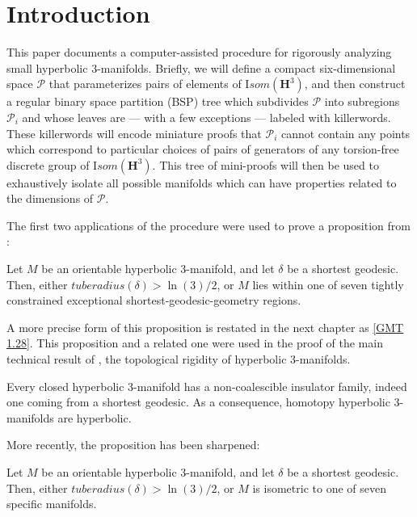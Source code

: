 \def\Arccosh{{\mathrm Arccosh}}
\chapter{Introduction}\label{Ch.intro}

This paper documents a computer-assisted procedure
for rigorously analyzing small hyperbolic $3$-manifolds.
Briefly, we will define a compact six-dimensional space ${\mathcal P}$
that parameterizes pairs of elements of ${\mathrm Isom}({\mathbf H}^3)$,
and then construct a regular binary space partition (BSP) tree
which subdivides ${\mathcal P}$ into subregions ${\mathcal P_i}$
and whose leaves are --- with a few exceptions --- labeled with killerwords.
These killerwords will encode miniature proofs that ${\mathcal P_i}$
cannot contain any points which correspond to
particular choices of pairs of generators of
any torsion-free discrete group of ${\mathrm Isom}({\mathbf H}^3)$.
This tree of mini-proofs will then be used
to exhaustively isolate all possible manifolds
which can have properties related to the dimensions of ${\mathcal P}$.

The first two applications of the procedure
were used to prove a proposition from \cite{GMT}:

\begin{proposition}{\cite{GMT}}
Let $M$ be an orientable hyperbolic $3$-manifold, and let $\delta$ be
a shortest geodesic. Then, either ${\mathit tuberadius}(\delta) > \ln(3)/2$,
or $M$ lies within one of seven tightly constrained
exceptional shortest-geodesic-geometry regions.
\end{proposition}

A more precise form of this proposition is restated in the next chapter
as \ref{GMT 1.28}.
This proposition and a related one were used in the proof of
the main technical result of \cite{GMT}, the topological rigidity of hyperbolic 3-manifolds. 

\begin{theorem}{\cite{GMT}}\label{GMT 0.2}
Every closed hyperbolic $3$-manifold
has a non-coalescible insulator family,
indeed one coming from a shortest geodesic.
As a consequence,
homotopy hyperbolic $3$-manifolds are hyperbolic.
\end{theorem}

More recently, the proposition has been sharpened:

\begin{theorem}{}
Let $M$ be an orientable hyperbolic $3$-manifold,
and let $\delta$ be a shortest geodesic.
Then, either ${\mathit tuberadius}(\delta) > \ln(3)/2$, or
$M$ is isometric to one of seven specific manifolds.
\end{theorem}

